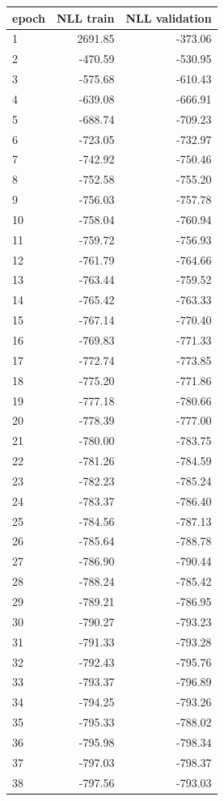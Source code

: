 \begin{tabular}{lrr}
\hline
epoch & NLL train & NLL validation \\
\hline
1 & 2691.85 & -373.06 \\
2 & -470.59 & -530.95 \\
3 & -575.68 & -610.43 \\
4 & -639.08 & -666.91 \\
5 & -688.74 & -709.23 \\
6 & -723.05 & -732.97 \\
7 & -742.92 & -750.46 \\
8 & -752.58 & -755.20 \\
9 & -756.03 & -757.78 \\
10 & -758.04 & -760.94 \\
11 & -759.72 & -756.93 \\
12 & -761.79 & -764.66 \\
13 & -763.44 & -759.52 \\
14 & -765.42 & -763.33 \\
15 & -767.14 & -770.40 \\
16 & -769.83 & -771.33 \\
17 & -772.74 & -773.85 \\
18 & -775.20 & -771.86 \\
19 & -777.18 & -780.66 \\
20 & -778.39 & -777.00 \\
21 & -780.00 & -783.75 \\
22 & -781.26 & -784.59 \\
23 & -782.23 & -785.24 \\
24 & -783.37 & -786.40 \\
25 & -784.56 & -787.13 \\
26 & -785.64 & -788.78 \\
27 & -786.90 & -790.44 \\
28 & -788.24 & -785.42 \\
29 & -789.21 & -786.95 \\
30 & -790.27 & -793.23 \\
31 & -791.33 & -793.28 \\
32 & -792.43 & -795.76 \\
33 & -793.37 & -796.89 \\
34 & -794.25 & -793.26 \\
35 & -795.33 & -788.02 \\
36 & -795.98 & -798.34 \\
37 & -797.03 & -798.37 \\
38 & -797.56 & -793.03 \\

\end{tabular}
